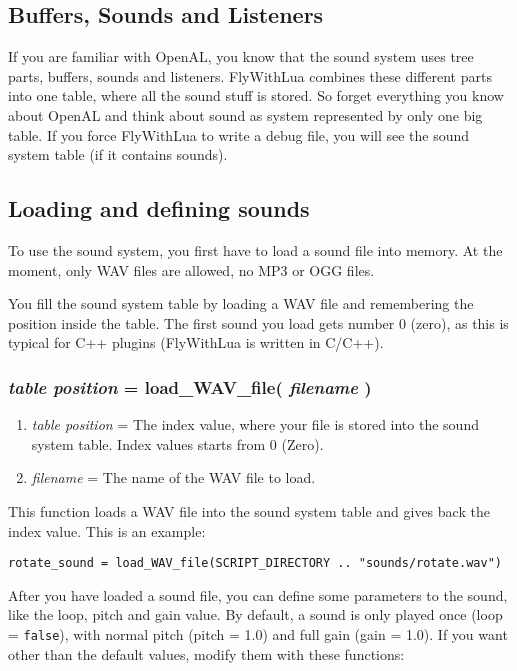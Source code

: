 \documentclass[11pt,parskip=half,a4paper]{scrartcl}
\begin{document}
\subsection{Buffers, Sounds and Listeners}

If you are familiar with OpenAL, you know that the sound system uses tree parts, buffers, sounds and listeners. FlyWithLua combines these different parts into one table, where all the sound stuff is stored. So forget everything you know about OpenAL and think about sound as system represented by only one big table. If you force FlyWithLua to write a debug file, you will see the sound system table (if it contains sounds).

\subsection{Loading and defining sounds}

To use the sound system, you first have to load a sound file into memory. At the moment, only WAV files are allowed, no MP3 or OGG files.

You fill the sound system table by loading a WAV file and remembering the position inside the table. The first sound you load gets number 0 (zero), as this is typical for C++ plugins (FlyWithLua is written in C/C++).

\subsubsection{\emph{table position} = load\_WAV\_file( \emph{filename} )}

\begin{enumerate}
	\item \emph{table position} = The index value, where your file is stored into the sound system table. Index values starts from 0 (Zero).
	\item \emph{filename} = The name of the WAV file to load.
\end{enumerate}

This function loads a WAV file into the sound system table and gives back the index value. This is an example:


\begin{lstlisting}
rotate_sound = load_WAV_file(SCRIPT_DIRECTORY .. "sounds/rotate.wav")
\end{lstlisting}

After you have loaded a sound file, you can define some parameters to the sound, like the loop, pitch and gain value. By default, a sound is only played once (loop = \verb|false|), with normal pitch (pitch = 1.0) and full gain (gain = 1.0). If you want other than the default values, modify them with these functions:
\end{document}
